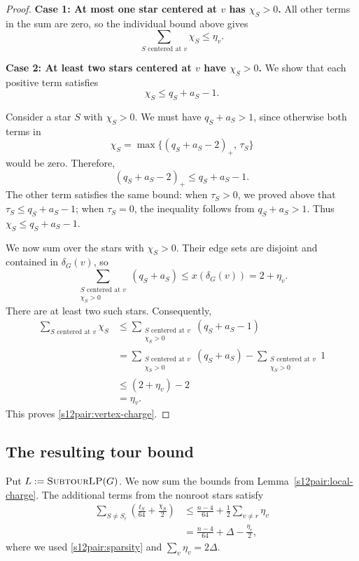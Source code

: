 \documentclass[11pt]{amsart}
\newcommand{\1}{\mathbbm{1}}
\newcommand{\SubtourLP}{\textsc{SubtourLP}}
\begin{document}
\begin{proof}
\smallskip\noindent
\textbf{Case 1: At most one star centered at $v$ has $\chi_S>0$.}
All other terms in the sum are zero, so the individual bound
above gives
\[
 \sum_{S\text{ centered at }v}\chi_S\le\eta_v.
\]

\smallskip\noindent
\smallskip\noindent
\textbf{Case 2: At least two stars centered at $v$ have $\chi_S>0$.}
We show that each positive term satisfies
\[
 \chi_S\le q_S+a_S-1.
\]

Consider a star $S$ with $\chi_S>0$. We must have
$q_S+a_S>1$, since otherwise both terms in
\[
 \chi_S=\max\{(q_S+a_S-2)_+,\,\tau_S\}
\]
would be zero. Therefore,
\[
 (q_S+a_S-2)_+\le q_S+a_S-1.
\]
The other term satisfies the same bound: when $\tau_S>0$,
we proved above that $\tau_S\le q_S+a_S-1$; when $\tau_S=0$,
the inequality follows from $q_S+a_S>1$. Thus
$\chi_S\le q_S+a_S-1$.

We now sum over the stars with $\chi_S>0$. Their edge sets
are disjoint and contained in $\delta_G(v)$, so
\[
 \sum_{\substack{S\text{ centered at }v\\\chi_S>0}}
       (q_S+a_S)
 \le x(\delta_G(v))=2+\eta_v.
\]
There are at least two such stars. Consequently,
\[
 \begin{aligned}
 \sum_{S\text{ centered at }v}\chi_S
 &\le
 \sum_{\substack{S\text{ centered at }v\\\chi_S>0}}
       (q_S+a_S-1)\\
 &=
 \sum_{\substack{S\text{ centered at }v\\\chi_S>0}}
       (q_S+a_S)
 -
 \sum_{\substack{S\text{ centered at }v\\\chi_S>0}}1\\
 &\le(2+\eta_v)-2\\
 &=\eta_v.
 \end{aligned}
\]
This proves \eqref{s12pair:vertex-charge}.
\end{proof}

\subsection{The resulting tour bound}
\label{subsec:general-aggregation}

{Put $L:=\text{\SubtourLP}(G)$.}
We now sum the bounds from Lemma~\ref{s12pair:local-charge}.
The additional terms from the nonroot stars satisfy
\[
 \begin{aligned}
 \sum_{S\ne S_r}\left(\frac{t_S}{64}+\frac{\chi_S}{2}\right)
 &\le\frac{n-4}{64}+\frac12\sum_{v\ne r}\eta_v\\
 &=\frac{n-4}{64}+\Delta-\frac{\eta_r}{2},
 \end{aligned}
\]
where we used \eqref{s12pair:sparsity} and
$\sum_v\eta_v=2\Delta$.
\end{document}
